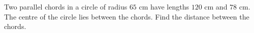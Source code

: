 Two parallel chords in a circle of radius $65$ cm have lengths $120$ cm and $78$ cm. The centre of the circle lies between the chords. Find the distance between the chords.
